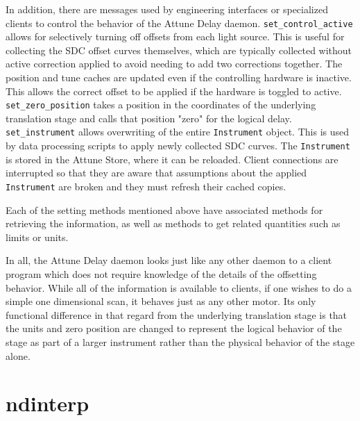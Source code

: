In addition, there are messages used by engineering interfaces or specialized clients to control the behavior of the Attune Delay daemon.
\texttt{set\_control\_active} allows for selectively turning off offsets from each light source.
This is useful for collecting the SDC offset curves themselves, which are typically collected without active correction applied to avoid needing to add two corrections together.
The position and tune caches are updated even if the controlling hardware is inactive.
This allows the correct offset to be applied if the hardware is toggled to active.
\texttt{set\_zero\_position} takes a position in the coordinates of the underlying translation stage and calls that position "zero" for the logical delay.
\texttt{set\_instrument} allows overwriting of the entire \texttt{Instrument} object.
This is used by data processing scripts to apply newly collected SDC curves.
The \texttt{Instrument} is stored in the Attune Store, where it can be reloaded.
Client connections are interrupted so that they are aware that assumptions about the applied \texttt{Instrument} are broken and they must refresh their cached copies.

Each of the setting methods mentioned above have associated methods for retrieving the information, as well as methods to get related quantities such as limits or units.

In all, the Attune Delay daemon looks just like any other \yaq{} daemon to a client program which does not require knowledge of the details of the offsetting behavior.
While all of the information is available to clients, if one wishes to do a simple one dimensional scan, it behaves just as any other motor.
Its only functional difference in that regard from the underlying translation stage is that the units and zero position are changed to represent the logical behavior of the stage as part of a larger instrument rather than the physical behavior of the stage alone.

\clearpage

\section{ndinterp}  %


